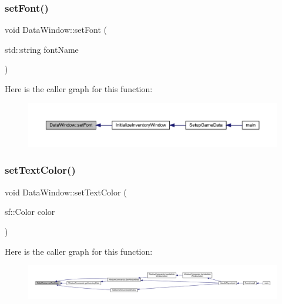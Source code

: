 \subsubsection{\texorpdfstring{set\+Font()}{setFont()}}
{\footnotesize\ttfamily void Data\+Window\+::set\+Font (\begin{DoxyParamCaption}\item[{std\+::string}]{font\+Name }\end{DoxyParamCaption})}

Here is the caller graph for this function\+:
\nopagebreak
\begin{figure}[H]
\begin{center}
\leavevmode
\includegraphics[width=350pt]{class_data_window_a66d08b9e2df3b4960fe4e030aabf61be_icgraph}
\end{center}
\end{figure}
\mbox{\label{class_data_window_a05ac7ad6357b9cabd0436c181c6cf29d}} 
\subsubsection{\texorpdfstring{set\+Text\+Color()}{setTextColor()}}
{\footnotesize\ttfamily void Data\+Window\+::set\+Text\+Color (\begin{DoxyParamCaption}\item[{sf\+::\+Color}]{color }\end{DoxyParamCaption})}

Here is the caller graph for this function\+:
\nopagebreak
\begin{figure}[H]
\begin{center}
\leavevmode
\includegraphics[width=350pt]{class_data_window_a05ac7ad6357b9cabd0436c181c6cf29d_icgraph}
\end{center}
\end{figure}
\mbox{\label{class_data_window_aa9fe53356b3989e0781a13a03814aaac}} 
